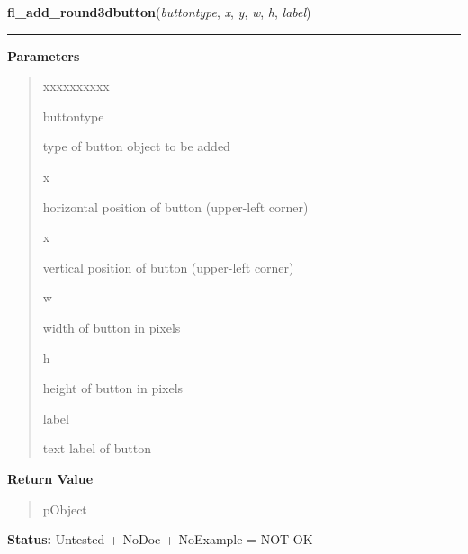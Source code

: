     \label{xformslib:library:fl_add_round3dbutton}

    \vspace{0.5ex}

\hspace{.8\funcindent}\begin{boxedminipage}{\funcwidth}

    \raggedright \textbf{fl\_add\_round3dbutton}(\textit{buttontype}, \textit{x}, \textit{y}, \textit{w}, \textit{h}, \textit{label})

    \vspace{-1.5ex}

    \rule{\textwidth}{0.5\fboxrule}
\setlength{\parskip}{2ex}
\setlength{\parskip}{1ex}
      \textbf{Parameters}
      \vspace{-1ex}

      \begin{quote}
        \begin{Ventry}{xxxxxxxxxx}

          \item[buttontype]

          type of button object to be added

          \item[x]

          horizontal position of button (upper-left corner)

          \item[x]

          vertical position of button (upper-left corner)

          \item[w]

          width of button in pixels

          \item[h]

          height of button in pixels

          \item[label]

          text label of button

        \end{Ventry}

      \end{quote}

      \textbf{Return Value}
    \vspace{-1ex}

      \begin{quote}
      pObject

      \end{quote}

\textbf{Status:} Untested + NoDoc + NoExample = NOT OK



    \end{boxedminipage}

